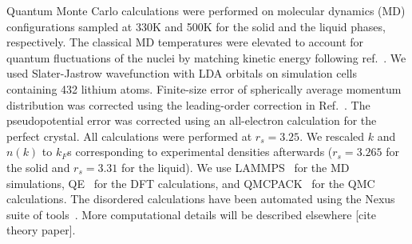\documentclass[twocolumn,showpacs,showkeys,fleqn,prl,superscriptaddress]{revtex4}%
\begin{document}
\vspace{10mm}

Quantum Monte Carlo calculations were performed on molecular dynamics (MD) configurations sampled at 330K and 500K for the solid and the liquid phases, respectively. The classical MD temperatures were elevated to account for quantum fluctuations of the nuclei by matching kinetic energy following ref.~\cite{filippi98}. We used Slater-Jastrow wavefunction with LDA orbitals on simulation cells containing 432 lithium atoms. Finite-size error of spherically average momentum distribution was corrected using the leading-order correction in Ref.~\cite{holz09}. The pseudopotential error was corrected using an all-electron calculation for the perfect crystal. All calculations were performed at $r_s=3.25$. We rescaled $k$ and $n(k)$ to $k_F$s corresponding to experimental densities afterwards ($r_s=3.265$ for the solid and $r_s=3.31$ for the liquid). We use LAMMPS~\cite{Plimpton1993} for the MD simulations, QE~\cite{Giannozzi2009,Enkovaara2017} for the DFT calculations, and QMCPACK~\cite{Kim2018} for the QMC calculations. The disordered calculations have been automated using the Nexus suite of tools~\cite{Krogel2016}.
More computational details will be described elsewhere [cite theory paper].

\end{document}
